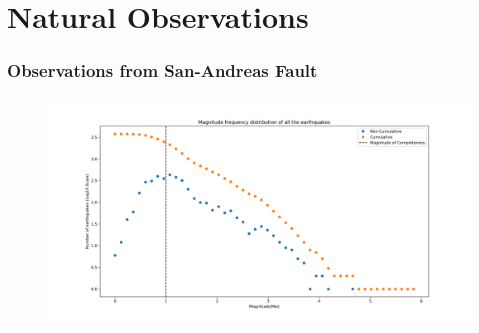 \documentclass{beamer}
\begin{document}
\section{Natural Observations}
\begin{frame}
    \frametitle{Observations from San-Andreas Fault}
    \begin{figure}
        \includegraphics[width=\textwidth]{images/mfd_complete} 
    \end{figure}
\end{frame}

\end{document}
